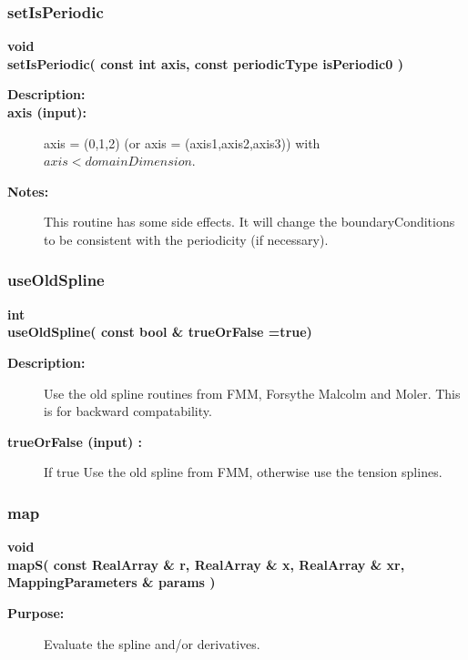 \subsubsection{setIsPeriodic}
 
\begin{flushleft} \textbf{%
void  \\ 
\settowidth{\SplineMappingIncludeArgIndent}{setIsPeriodic(}%
setIsPeriodic( const int axis, const periodicType isPeriodic0 )
}\end{flushleft}
\begin{description}
\item[{\bf Description:}] 
\item[{\bf axis (input):}]  axis = (0,1,2) (or axis = (axis1,axis2,axis3)) with $axis<domainDimension$.
\item[{\bf Notes:}] 
    This routine has some side effects. It will change the boundaryConditions to be consistent
  with the periodicity (if necessary).
\end{description}
\subsubsection{useOldSpline}
 
\begin{flushleft} \textbf{%
int   \\ 
\settowidth{\SplineMappingIncludeArgIndent}{useOldSpline(}%
useOldSpline( const bool \& trueOrFalse  =true)
}\end{flushleft}
\begin{description}
\item[{\bf Description:}] 
  Use the old spline routines from FMM, Forsythe Malcolm and Moler. This is for backward
 compatability.
\item[{\bf trueOrFalse (input) :}]  If true Use the old spline from FMM, otherwise use the tension splines.

\end{description}
\subsubsection{map}
 
\begin{flushleft} \textbf{%
void  \\ 
\settowidth{\SplineMappingIncludeArgIndent}{mapS(}%
mapS( const RealArray \& r, RealArray \& x, RealArray \& xr, MappingParameters \& params )
}\end{flushleft}
\begin{description}
\item[{\bf Purpose:}]  Evaluate the spline and/or derivatives. 
\end{description}
